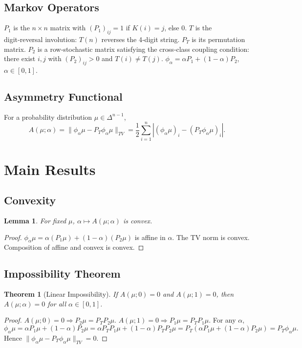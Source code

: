 \documentclass[12pt]{article}
\newtheorem{theorem}{Theorem}
\newtheorem{lemma}{Lemma}
\begin{document}
\subsection{Markov Operators}
$P_1$ is the $n\times n$ matrix with $(P_1)_{ij}=1$ if $K(i)=j$, else $0$.
$T$ is the digit‑reversal involution: $T(n)$ reverses the 4‑digit string. $P_T$ is its permutation matrix.
$P_2$ is a row‑stochastic matrix satisfying the cross‑class coupling condition: there exist $i,j$ with $(P_2)_{ij}>0$ and $T(i)\neq T(j)$.
$\phi_\alpha = \alpha P_1 + (1-\alpha)P_2$, $\alpha\in[0,1]$.

\subsection{Asymmetry Functional}
For a probability distribution $\mu\in\Delta^{n-1}$,
\[
A(\mu;\alpha)=\|\phi_\alpha\mu - P_T\phi_\alpha\mu\|_{TV}
= \frac12\sum_{i=1}^n |(\phi_\alpha\mu)_i - (P_T\phi_\alpha\mu)_i|.
\]

\section{Main Results}

\subsection{Convexity}
\begin{lemma}
For fixed $\mu$, $\alpha\mapsto A(\mu;\alpha)$ is convex.
\end{lemma}
\begin{proof}
$\phi_\alpha\mu = \alpha(P_1\mu)+(1-\alpha)(P_2\mu)$ is affine in $\alpha$. The TV norm is convex. Composition of affine and convex is convex. 
\end{proof}

\subsection{Impossibility Theorem}
\begin{theorem}[Linear Impossibility]
If $A(\mu;0)=0$ and $A(\mu;1)=0$, then $A(\mu;\alpha)=0$ for all $\alpha\in[0,1]$.
\end{theorem}
\begin{proof}
$A(\mu;0)=0 \Rightarrow P_2\mu = P_T P_2\mu$. $A(\mu;1)=0 \Rightarrow P_1\mu = P_T P_1\mu$.
For any $\alpha$,
\[
\phi_\alpha\mu = \alpha P_1\mu + (1-\alpha)P_2\mu 
= \alpha P_T P_1\mu + (1-\alpha)P_T P_2\mu
= P_T(\alpha P_1\mu + (1-\alpha)P_2\mu) = P_T\phi_\alpha\mu.
\]
Hence $\|\phi_\alpha\mu - P_T\phi_\alpha\mu\|_{TV}=0$.
\end{proof}
\end{document}
